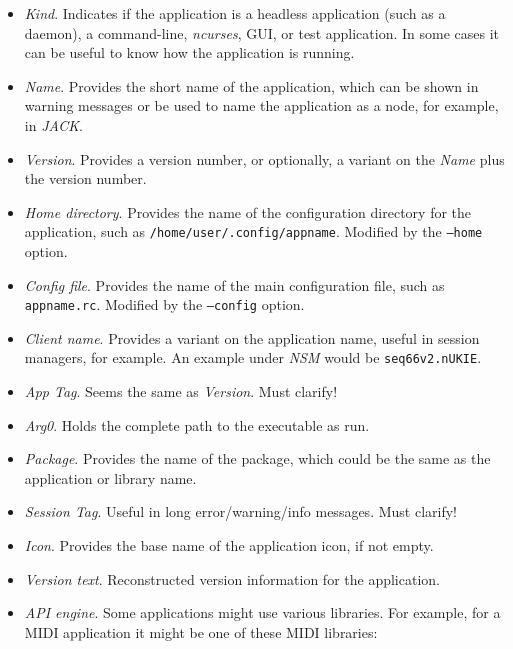    \begin{itemize}
      \item \textsl{Kind}.
         Indicates if the application is a headless application (such as a
         daemon), a command-line, \textsl{ncurses}, GUI, or test application.
         In some cases it can be useful to know how the application is
         running.
      \item \textsl{Name}.
         Provides the short name of the application, which can be shown
         in warning messages or be used to name the application as a node, for
         example, in \textsl{JACK}.
      \item \textsl{Version}.
         Provides a version number, or optionally, a variant on the
         \textsl{Name} plus the version number.
      \item \textsl{Home directory}.
         Provides the name of the configuration directory for the application,
         such as \texttt{/home/user/.config/appname}.
         Modified by the \texttt{--home} option.
      \item \textsl{Config file}.
         Provides the name of the main configuration file, such as
         \texttt{appname.rc}.
         Modified by the \texttt{--config} option.
      \item \textsl{Client name}.
         Provides a variant on the application name, useful in session
         managers, for example.
         An example under \textsl{NSM} would be \texttt{seq66v2.nUKIE}.
      \item \textsl{App Tag}.
         Seems the same as \textsl{Version}. Must clarify!
      \item \textsl{Arg0}.
         Holds the complete path to the executable as run.
      \item \textsl{Package}.
         Provides the name of the package, which could be the same as the
         application or library name.
      \item \textsl{Session Tag}.
         Useful in long error/warning/info messages. Must clarify!
      \item \textsl{Icon}.
         Provides the base name of the application icon, if not empty.
      \item \textsl{Version text}.
         Reconstructed version information for the application.
      \item \textsl{API engine}.
         Some applications might use various libraries.
         For example, for a MIDI application it might be one of these
         MIDI libraries:

\end{itemize}
